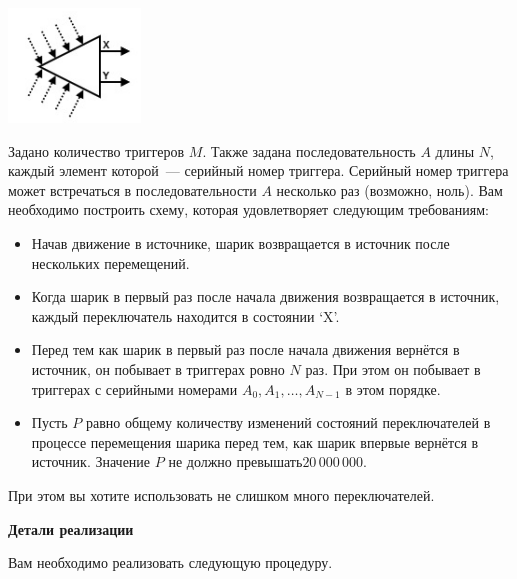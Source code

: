 \includegraphics{3.png}

Задано количество триггеров $M$. Также задана последовательность $A$ длины $N$,
каждый элемент которой~--- серийный номер триггера. Серийный номер триггера
может встречаться в последовательности $A$ несколько раз (возможно, ноль). Вам
необходимо построить схему, которая удовлетворяет следующим требованиям:

\begin{itemize}
    \item Начав движение в источнике, шарик возвращается в источник после
нескольких перемещений.
    \item Когда шарик в первый раз после начала движения возвращается в источник,
каждый переключатель находится в состоянии `X'.
    \item Перед тем как шарик в первый раз после начала движения вернётся в
источник, он побывает в триггерах ровно $N$ раз. При этом он побывает в
триггерах с серийными номерами  $A_0,A_1,\ldots,A_{N-1}$ в этом порядке.
    \item Пусть $P$ равно общему количеству изменений состояний переключателей в
процессе перемещения шарика перед тем, как шарик впервые вернётся в
источник. Значение $P$ не должно превышать$20\,000\,000$.
\end{itemize}

При этом вы хотите использовать не слишком много переключателей.

\textbf{Детали реализации}

Вам необходимо реализовать следующую процедуру.

